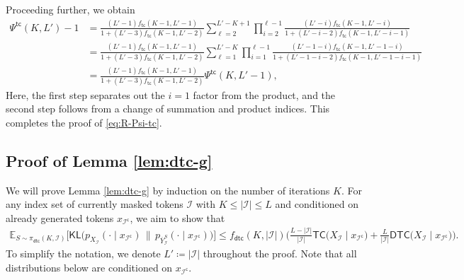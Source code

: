 \documentclass[english]{article}
\newcommand{\defn}{\coloneqq}
\newcommand{\cI}{\mathcal{I}}
\newcommand{\KL}{\mathsf{KL}}
\newcommand{\ol}{\overline}
\newcommand{\E}{\mathbb{E}}
\newcommand{\TC}{\mathsf{TC}}
\newcommand{\DTC}{\mathsf{DTC}}
\newcommand{\tc}{\mathsf{tc}}
\newcommand{\dtc}{\mathsf{dtc}}
\begin{document}
Proceeding further, we obtain
\begin{align*}
    \Psi^{\tc}(K, L') - 1 
    &= \frac{(L' - 1)f_\tc(K - 1, L' - 1)}{1 + (L' - 3)f_\tc(K - 1, L' - 2)} \sum_{\ell=2}^{L'-K+1} \prod_{i=2}^{\ell - 1} \frac{(L'-i)f_\tc(K-1, L' - i)}{1 + (L'-i-2)f_\tc(K-1, L' - i - 1)} \\ 
    &= \frac{(L' - 1)f_\tc(K - 1, L' - 1)}{1 + (L' - 3)f_\tc(K - 1, L' - 2)} \sum_{\ell = 1}^{L'-K} \prod_{i=1}^{\ell - 1} \frac{(L' - 1 - i)f_\tc(K-1, L' - 1 - i)}{1 + (L' - 1 - i- 2)f_\tc(K - 1, L' - 1 - i - 1)} \\
    &= \frac{(L' - 1)f_\tc(K - 1, L' - 1)}{1 + (L' - 3)f_\tc(K - 1, L' - 2)} \Psi^{\tc}(K, L'-1),
\end{align*}
Here, the first step separates out the $i = 1$ factor from the product, and the second step follows from a change of summation and product indices.
This completes the proof of \eqref{eq:R-Psi-tc}.


\subsection{Proof of Lemma \ref{lem:dtc-g}} \label{sec:proof-dtc-g}

We will prove Lemma \ref{lem:dtc-g} by induction on the number of iterations $K$. For any index set of currently masked tokens $\cI$ with $K \leq |\cI| \leq L$ and conditioned on already generated tokens $x_{\cI^\mathsf{c}}$, we aim to show that
\begin{align*}
    \E_{S \sim \pi_{\dtc}(K, \cI)} \Big[\KL\big(p_{X_{\cI}}(\cdot \mid x_{\cI^\mathsf{c}}) \,\|\, p_{\ol Y_{\cI}^S}(\cdot \mid x_{\cI^\mathsf{c}} ) \big) \Big] \leq f_\dtc(K, |\cI|)\bigg(\frac{L - |\cI|}{|\cI|} \TC \big(X_{\cI} \mid x_{\cI^\mathsf{c}}\big) + \frac{L}{|\cI|}\DTC \big(X_{\cI}\mid x_{\cI^\mathsf{c}}\big) \bigg).
\end{align*}
To simplify the notation, we denote $ L' \defn |\cI| $ throughout the proof.
Note that all distributions below are conditioned on $x_{\cI^\mathsf{c}}$.
\end{document}
